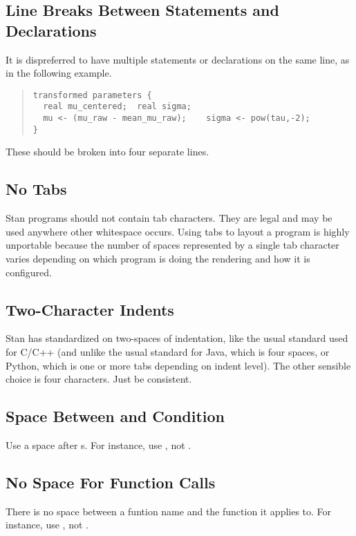 \subsection{Line Breaks Between Statements and Declarations}

It is dispreferred to have multiple statements or declarations on the
same line, as in the following example.
%
\begin{quote}
\begin{Verbatim}
transformed parameters {
  real mu_centered;  real sigma;
  mu <- (mu_raw - mean_mu_raw);    sigma <- pow(tau,-2);
}
\end{Verbatim}
\end{quote}
%
These should be broken into four separate lines.

\subsection{No Tabs}

Stan programs should not contain tab characters.  They are legal and
may be used anywhere other whitespace occurs.  Using tabs to layout a
program is highly unportable because the number of spaces
represented by a single tab character varies depending on which
program is doing the rendering and how it is configured.  

\subsection{Two-Character Indents}

Stan has standardized on two-spaces of indentation, like the
usual standard used for C/C++ (and unlike the usual standard
for Java, which is four spaces, or Python, which is one or more tabs
depending on indent level).   The other sensible choice is four
characters.  Just be consistent.  

\subsection{Space Between  and Condition}

Use a space after s.  For instance, use , not
.

\subsection{No Space For Function Calls}

There is no space between a funtion name and the function it applies
to.  For instance, use , not .

